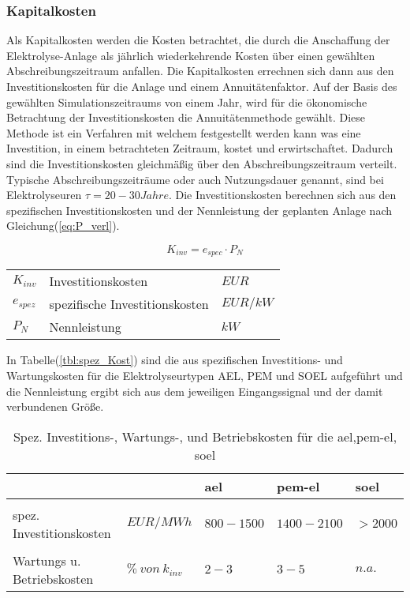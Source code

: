 \documentclass[onecolumn,10pt,titlepage]{article}
\begin{document}
			\subsubsection*{Kapitalkosten}
			Als Kapitalkosten werden die Kosten betrachtet, die durch die Anschaffung der Elektrolyse-Anlage als jährlich wiederkehrende Kosten über einen gewählten Abschreibungszeitraum anfallen. Die Kapitalkosten errechnen sich dann aus den Investitionskosten für die Anlage und einem Annuitätenfaktor. Auf der Basis des gewählten Simulationszeitraums von einem Jahr, wird für die ökonomische Betrachtung der Investitionskosten die Annuitätenmethode gewählt. Diese Methode ist ein Verfahren mit welchem festgestellt werden kann was eine Investition, in einem betrachteten Zeitraum, kostet und erwirtschaftet. Dadurch sind die Investitionskosten gleichmäßig über den Abschreibungszeitraum verteilt. Typische Abschreibungszeiträume oder auch Nutzungsdauer genannt, sind bei Elektrolyseuren $\tau = 20-30 Jahre$.\cite{Missal.12.03.2014} Die Investitionskosten berechnen sich aus den spezifischen Investitionskosten und der Nennleistung der geplanten Anlage nach Gleichung(\ref{eq:P_verl}).

			\begin{equation}
			\label{eq:P_verl}
				K_{inv} = e_{spec} \cdot P_N
			\end{equation}

			\begin{table}[H]
				\begin{tabular*}{\textwidth}{lll}
					$K_{inv}$&Investitionskosten&$EUR$\\
					$e_{spez}$&spezifische Investitionskosten&$EUR/kW$\\
					$P_N$&Nennleistung&$kW$\\
				\end{tabular*}
			\end{table}

			In Tabelle(\ref{tbl:spez_Kost}) sind die aus \cite{Buttler.2018} spezifischen Investitions- und Wartungskosten für die Elektrolyseurtypen AEL, PEM und SOEL aufgeführt und die Nennleistung ergibt sich aus dem jeweiligen Eingangssignal und der damit verbundenen Größe.

			\begin{table}[H]

				\caption{Spez. Investitions-, Wartungs-, und Betriebskosten für die \gls{ael},\gls{pem}-\gls{el}, \gls{soel}}
					\begin{tabular*}{\textwidth}{lll|l|l}

						&& {\textbf{\gls{ael}}}& {\textbf{\gls{pem}-\gls{el}}} & {\textbf{\gls{soel}}} \\
						\hline\hline
						&&&&\\
						spez. Investitionskosten& $EUR/MWh$ &$800-1500$&$1400-2100$&$>2000$\\
						&&&&\\
						Wartungs u. Betriebskosten& $\%~von~k_{inv}$ &$2-3$&$3-5$&$n.a.$\\
					\end{tabular*}
					\label{tab:spez_Kost}
				\end{table}
\end{document}
